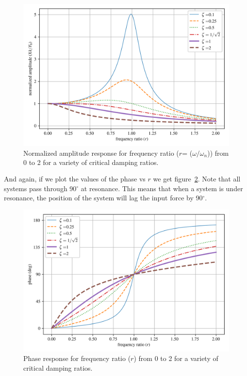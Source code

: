 \documentclass[12pt,letter]{article}
\numberwithin{ex}{section} %
\numberwithin{re}{section} %
\numberwithin{vcs}{section} %
\begin{document}
			\begin{figure}[H]
				\centering
				\includegraphics[]{../figures/underdamped_frequency_response_amplitude.png}
				\caption{Normalized amplitude response for frequency ratio ($r$= ($\omega/\omega_n$)) from 0 to 2 for a variety of critical damping ratios.}
				\label{fig:underdamped_frequency_response_amplitude}
			\end{figure}
			\noindent And again, if we plot the values of the phase vs $r$ we get figure~\ref{fig:underdamped_frequency_response_phase}. Note that all systems pass through 90$^\circ$ at resonance. This means that when a system is under resonance, the position of the system will lag the input force by 90$^\circ$.
			\begin{figure}[H]
				\centering
				\includegraphics[]{../figures/underdamped_frequency_response_phase.png}
				\caption{Phase response for frequency ratio ($r$) from 0 to 2 for a variety of critical damping ratios.}
				\label{fig:underdamped_frequency_response_phase}
			\end{figure}				
\end{document}
